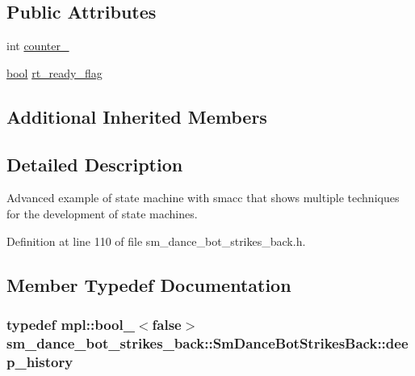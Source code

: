 \subsection*{Public Attributes}
\begin{DoxyCompactItemize}
\item 
int \hyperlink{structsm__dance__bot__strikes__back_1_1SmDanceBotStrikesBack_a0cf56e316022dde4b3da552ab9f68513}{counter\+\_}
\item 
\hyperlink{classbool}{bool} \hyperlink{structsm__dance__bot__strikes__back_1_1SmDanceBotStrikesBack_a609265a94c2575580fbb014f551a066a}{rt\+\_\+ready\+\_\+flag}
\end{DoxyCompactItemize}
\subsection*{Additional Inherited Members}


\subsection{Detailed Description}
Advanced example of state machine with smacc that shows multiple techniques for the development of state machines. 

Definition at line 110 of file sm\+\_\+dance\+\_\+bot\+\_\+strikes\+\_\+back.\+h.



\subsection{Member Typedef Documentation}
\subsubsection[{\texorpdfstring{deep\+\_\+history}{deep_history}}]{\setlength{\rightskip}{0pt plus 5cm}typedef mpl\+::bool\+\_\+$<$false$>$ {\bf sm\+\_\+dance\+\_\+bot\+\_\+strikes\+\_\+back\+::\+Sm\+Dance\+Bot\+Strikes\+Back\+::deep\+\_\+history}}\hypertarget{structsm__dance__bot__strikes__back_1_1SmDanceBotStrikesBack_a3192d4079cbcf0739c7002538767ad22}{}\label{structsm__dance__bot__strikes__back_1_1SmDanceBotStrikesBack_a3192d4079cbcf0739c7002538767ad22}



